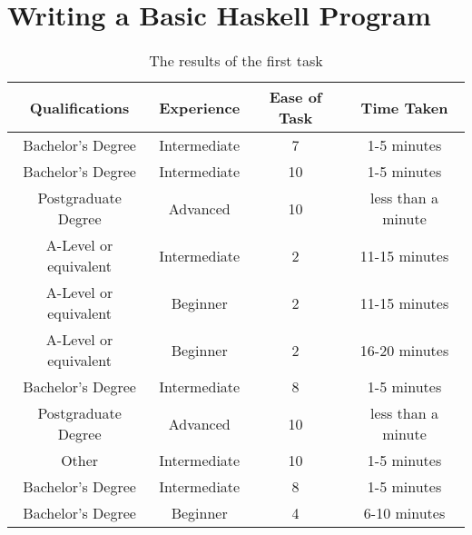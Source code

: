\documentclass[../main.tex]{subfiles}
\begin{document}
        \section*{Writing a Basic Haskell Program}
            \begin{table}[H]
                \centering
                \begin{tabular}{c|c|c|c}
                    \textbf{Qualifications} & \textbf{Experience} & \textbf{Ease of Task} & \textbf{Time Taken} \\
                    \hline
                    Bachelor's Degree       & Intermediate        & 7                     & 1-5 minutes         \\
                    Bachelor's Degree       & Intermediate        & 10                    & 1-5 minutes         \\
                    Postgraduate Degree     & Advanced            & 10                    & less than a minute  \\
                    A-Level or equivalent   & Intermediate        & 2                     & 11-15 minutes       \\
                    A-Level or equivalent   & Beginner            & 2                     & 11-15 minutes       \\
                    A-Level or equivalent   & Beginner            & 2                     & 16-20 minutes       \\
                    Bachelor's Degree       & Intermediate        & 8                     & 1-5 minutes         \\
                    Postgraduate Degree     & Advanced            & 10                    & less than a minute  \\
                    Other                   & Intermediate        & 10                    & 1-5 minutes         \\
                    Bachelor's Degree       & Intermediate        & 8                     & 1-5 minutes         \\
                    Bachelor's Degree       & Beginner            & 4                     & 6-10 minutes        \\
                \end{tabular}
                \caption{The results of the first task}
            \end{table}
\end{document}
